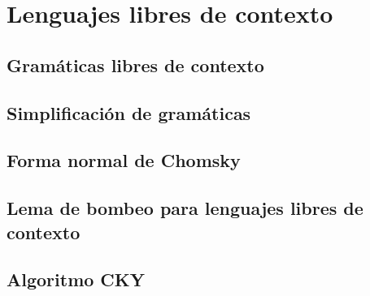 \section{Lenguajes libres de contexto}

\subsection{Gramáticas libres de contexto}
\subsection{Simplificación de gramáticas}
\subsection{Forma normal de Chomsky}
\subsection{Lema de bombeo para lenguajes libres de contexto}
\subsection{Algoritmo CKY}
